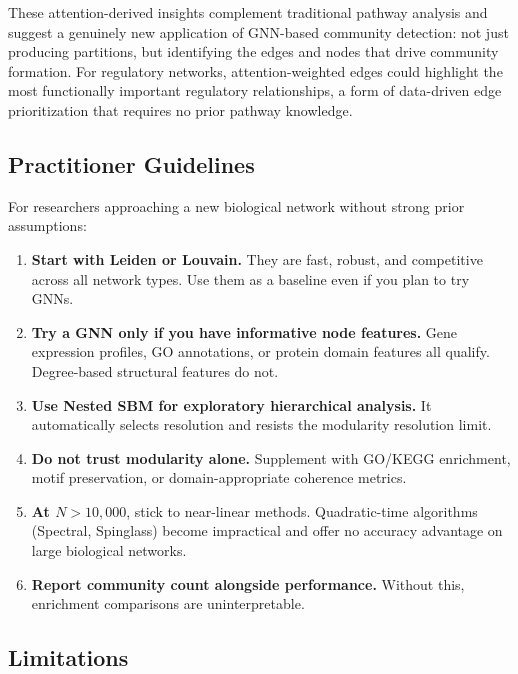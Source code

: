 \documentclass[11pt]{article}
\begin{document}
These attention-derived insights complement traditional pathway analysis and suggest a genuinely new application of GNN-based community detection: not just producing partitions, but identifying the edges and nodes that drive community formation.
For regulatory networks, attention-weighted edges could highlight the most functionally important regulatory relationships, a form of data-driven edge prioritization that requires no prior pathway knowledge.

\subsection{Practitioner Guidelines}

For researchers approaching a new biological network without strong prior assumptions:

\begin{enumerate}[leftmargin=*]
  \item \textbf{Start with Leiden or Louvain.} They are fast, robust, and competitive across all network types. Use them as a baseline even if you plan to try GNNs.
  \item \textbf{Try a GNN only if you have informative node features.} Gene expression profiles, GO annotations, or protein domain features all qualify. Degree-based structural features do not.
  \item \textbf{Use Nested SBM for exploratory hierarchical analysis.} It automatically selects resolution and resists the modularity resolution limit.
  \item \textbf{Do not trust modularity alone.} Supplement with GO/KEGG enrichment, motif preservation, or domain-appropriate coherence metrics.
  \item \textbf{At $N > 10{,}000$}, stick to near-linear methods. Quadratic-time algorithms (Spectral, Spinglass) become impractical and offer no accuracy advantage on large biological networks.
  \item \textbf{Report community count alongside performance.} Without this, enrichment comparisons are uninterpretable.
\end{enumerate}

\subsection{Limitations}
\end{document}
